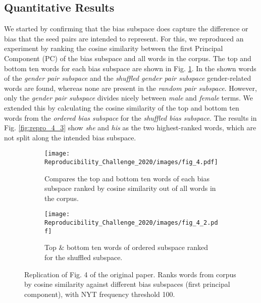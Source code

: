 \subsection{Quantitative Results} We started by confirming that the bias subspace does capture the
difference or bias that the seed pairs are intended to represent. For this, we reproduced an
experiment by \citet{antoniak-mimno-2021-bad} ranking the cosine similarity between the first
Principal Component (PC) of the bias subspace and all words in the corpus. The top and bottom ten
words for each bias subspace are shown in Fig. \ref{fig:repro_4_1}. In the shown words of the
\textit{gender pair subspace} and the \textit{shuffled gender pair subspace} gender-related words
are found, whereas none are present in the \textit{random pair subspace}. However, only the
\textit{gender pair subspace} divides nicely between \textit{male} and \textit{female} terms. We
extended this by calculating the cosine similarity of the top and bottom ten words from the
\textit{ordered bias subspace} for the \textit{shuffled bias subspace}. The results in Fig.
\ref{fig:repro_4_3} show \textit{she} and \textit{his} as the two highest-ranked words, which are
not split along the intended bias subspace.

\begin{figure}[ht]
	\centering
	\begin{subfigure}[b]{0.6\textwidth}
		\centering
		\texttt{[image: Reproducibility\_Challenge\_2020/images/fig\_4.pdf]}
		\caption{Compares the top and bottom ten words of each bias subspace ranked by cosine similarity out of all words in the corpus.}
		\label{fig:repro_4_1}
	\end{subfigure}
	\hfill
	\begin{subfigure}[b]{0.33\textwidth}
		\centering
		\texttt{[image: Reproducibility\_Challenge\_2020/images/fig\_4\_2.pdf]}
		\caption{Top \& bottom ten words of ordered subspace ranked for the shuffled subspace.}
		\label{fig:repro_4_2}
	\end{subfigure}
	\caption{Replication of Fig. 4 of the original paper. Ranks words from corpus by cosine similarity against different bias subspaces (first principal component), with NYT frequency threshold 100.}
	\label{fig:repro_4}
\end{figure}

